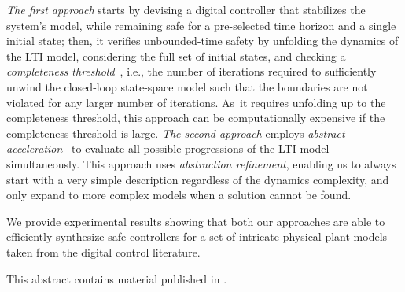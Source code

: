 \documentclass[submission]{eptcs}
\begin{document}
\emph{The first approach} starts by devising a
digital controller that stabilizes the system's model, while remaining safe for a
pre-selected time horizon and a single initial state; then, it verifies
unbounded-time safety by unfolding the dynamics of the LTI model, considering the
full set of initial states, and checking a \emph{completeness
threshold}~\cite{DBLP:conf/vmcai/KroeningS03}, i.e., the number of
iterations required to sufficiently unwind the closed-loop state-space
model such that the boundaries are not violated for any larger number of
iterations.  As~it requires unfolding up to the completeness threshold, this
approach can be computationally expensive if the completeness threshold is large.
%
\emph{The second approach}
employs \emph{abstract acceleration}~\cite{cattaruzza2015unbounded} to
evaluate all possible progressions of the LTI model simultaneously. 
This approach uses \emph{abstraction refinement},
enabling us to always start with a very simple description regardless of the
dynamics complexity, and only expand to more complex models
when a solution cannot be found.

We provide experimental results showing that both our approaches are able to
efficiently synthesize safe controllers for a set of intricate physical
plant models taken from the digital control literature.

This abstract contains material published in \cite{DBLP:conf/kbse/AbateBCCCDKKP17,DBLP:conf/cav/AbateBCCDKKP17}.

       
  
\end{document}
